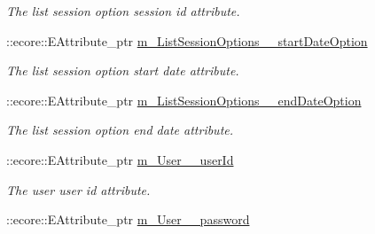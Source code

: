 \begin{DoxyCompactItemize}
\begin{DoxyCompactList}\small\item\em The list session option session id attribute. \item\end{DoxyCompactList}\item 
\hypertarget{classUMS__Data_1_1UMS__DataPackage_a855b0aeb83e117bfef3ac78407480c87}{
::ecore::EAttribute\_\-ptr \hyperlink{classUMS__Data_1_1UMS__DataPackage_a855b0aeb83e117bfef3ac78407480c87}{m\_\-ListSessionOptions\_\-\_\-startDateOption}}
\label{classUMS__Data_1_1UMS__DataPackage_a855b0aeb83e117bfef3ac78407480c87}

\begin{DoxyCompactList}\small\item\em The list session option start date attribute. \item\end{DoxyCompactList}\item 
\hypertarget{classUMS__Data_1_1UMS__DataPackage_ad9d1c42a9e1d839fc445c45d0ce49608}{
::ecore::EAttribute\_\-ptr \hyperlink{classUMS__Data_1_1UMS__DataPackage_ad9d1c42a9e1d839fc445c45d0ce49608}{m\_\-ListSessionOptions\_\-\_\-endDateOption}}
\label{classUMS__Data_1_1UMS__DataPackage_ad9d1c42a9e1d839fc445c45d0ce49608}

\begin{DoxyCompactList}\small\item\em The list session option end date attribute. \item\end{DoxyCompactList}\item 
\hypertarget{classUMS__Data_1_1UMS__DataPackage_a7c0066c7f09ef22aa501978b92c16e91}{
::ecore::EAttribute\_\-ptr \hyperlink{classUMS__Data_1_1UMS__DataPackage_a7c0066c7f09ef22aa501978b92c16e91}{m\_\-User\_\-\_\-userId}}
\label{classUMS__Data_1_1UMS__DataPackage_a7c0066c7f09ef22aa501978b92c16e91}

\begin{DoxyCompactList}\small\item\em The user user id attribute. \item\end{DoxyCompactList}\item 
\hypertarget{classUMS__Data_1_1UMS__DataPackage_a287fa94327172154d4df2136a83a643d}{
::ecore::EAttribute\_\-ptr \hyperlink{classUMS__Data_1_1UMS__DataPackage_a287fa94327172154d4df2136a83a643d}{m\_\-User\_\-\_\-password}}
\label{classUMS__Data_1_1UMS__DataPackage_a287fa94327172154d4df2136a83a643d}


\end{DoxyCompactItemize}
